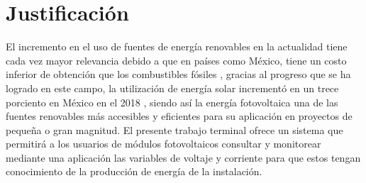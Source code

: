 \section{Justificación}
El incremento en el uso de fuentes de energía renovables en la actualidad tiene cada vez mayor relevancia debido a que en países como México, tiene un costo inferior de obtención que los combustibles fósiles \citep{Not1}, gracias al progreso que se ha logrado en este campo, la utilización de energía solar incrementó en un trece porciento en México en el 2018 \citep{Not2}, siendo así la energía fotovoltaica una de las fuentes renovables más accesibles y eficientes para su aplicación en proyectos de pequeña o gran magnitud.
El presente trabajo terminal ofrece un sistema que permitirá a los usuarios de módulos fotovoltaicos consultar y monitorear mediante una aplicación las variables de voltaje y corriente para que estos tengan conocimiento de la producción de energía de la instalación.
